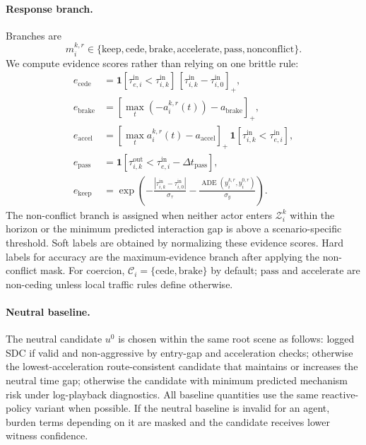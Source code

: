 \documentclass[10pt]{article}
\newcommand{\ind}{\mathbf{1}}
\newcommand{\cC}{\mathcal{C}}
\newcommand{\cZ}{\mathcal{Z}}
\begin{document}
\paragraph{Response branch.}
Branches are
\[
m_i^{k,r}\in
\{\mathrm{keep},\mathrm{cede},\mathrm{brake},\mathrm{accelerate},\mathrm{pass},\mathrm{nonconflict}\}.
\]
We compute evidence scores rather than relying on one brittle rule:
\[
\begin{aligned}
e_{\mathrm{cede}} &= \ind[\tau_{e,i}^{\mathrm{in}}<\tau_{i,k}^{\mathrm{in}}]\,
\left[\tau_{i,k}^{\mathrm{in}}-\tau_{i,0}^{\mathrm{in}}\right]_+,\\
e_{\mathrm{brake}} &= \left[\max_t(-a_i^{k,r}(t))-a_{\mathrm{brake}}\right]_+,\\
e_{\mathrm{accel}} &= \left[\max_t a_i^{k,r}(t)-a_{\mathrm{accel}}\right]_+\,
\ind[\tau_{i,k}^{\mathrm{in}}<\tau_{e,i}^{\mathrm{in}}],\\
e_{\mathrm{pass}} &= \ind[\tau_{i,k}^{\mathrm{out}}<\tau_{e,i}^{\mathrm{in}}-\Delta t_{\mathrm{pass}}],\\
e_{\mathrm{keep}} &= \exp\!\left(-\frac{|\tau_{i,k}^{\mathrm{in}}-\tau_{i,0}^{\mathrm{in}}|}{\sigma_\tau}
-\frac{\operatorname{ADE}(y_i^{k,r},y_i^{0,r})}{\sigma_y}\right).
\end{aligned}
\]
The non-conflict branch is assigned when neither actor enters \(\cZ_i^k\) within the horizon or the minimum predicted interaction gap is above a scenario-specific threshold. Soft labels are obtained by normalizing these evidence scores. Hard labels for accuracy are the maximum-evidence branch after applying the non-conflict mask. For coercion, \(\cC_i=\{\mathrm{cede},\mathrm{brake}\}\) by default; \(\mathrm{pass}\) and \(\mathrm{accelerate}\) are non-ceding unless local traffic rules define otherwise.

\paragraph{Neutral baseline.}
The neutral candidate \(u^0\) is chosen within the same root scene as follows: logged SDC if valid and non-aggressive by entry-gap and acceleration checks; otherwise the lowest-acceleration route-consistent candidate that maintains or increases the neutral time gap; otherwise the candidate with minimum predicted mechanism risk under log-playback diagnostics. All baseline quantities use the same reactive-policy variant when possible. If the neutral baseline is invalid for an agent, burden terms depending on it are masked and the candidate receives lower witness confidence.
\end{document}
